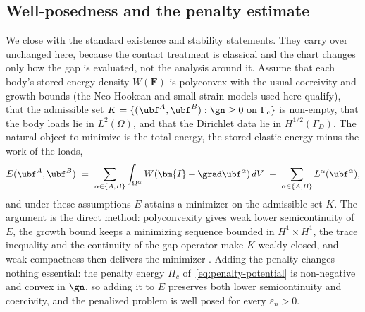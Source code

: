 \subsection{Well-posedness and the penalty estimate}\label{sec:form-wellposed}

We close with the standard existence and stability statements. They carry over unchanged here, because
the contact treatment is classical and the chart changes only how the gap is evaluated, not the
analysis around it. Assume that each body's stored-energy density $W(\bm{F})$ is polyconvex with the
usual coercivity and growth bounds (the Neo-Hookean and small-strain models used here qualify), that
the admissible set $K=\{(\ubf^A,\ubf^B): \gn\ge0\text{ on }\Gamma_c\}$ is non-empty, that the body
loads lie in
$L^2(\Omega)$, and that the Dirichlet data lie in $H^{1/2}(\Gamma_D)$. The natural object to minimize is the
total energy, the stored elastic energy minus the work of the loads,
\begin{equation}\label{eq:total-energy}
E(\ubf^A,\ubf^B)\ =\ \sum_{\alpha\in\{A,B\}}\int_{\Omega^\alpha}W(\bm{I}+\grad\ubf^\alpha)\,dV
\ -\ \sum_{\alpha\in\{A,B\}}L^\alpha(\ubf^\alpha),
\end{equation}
and under these assumptions $E$ attains a minimizer on the admissible set $K$. The argument is the
direct method: polyconvexity gives weak lower semicontinuity of $E$, the growth bound keeps a
minimizing sequence bounded in $H^1\times H^1$, the trace inequality and the continuity of the gap
operator make $K$ weakly closed, and weak compactness then delivers the minimizer
\citep{ball1977convexity,ciarlet1988mathematical}. Adding the penalty changes nothing essential: the
penalty energy $\Pi_c$ of~\eqref{eq:penalty-potential} is non-negative and convex in $\gn$, so adding
it to $E$ preserves both lower semicontinuity and coercivity, and the penalized problem is well posed
for every $\varepsilon_n>0$.

